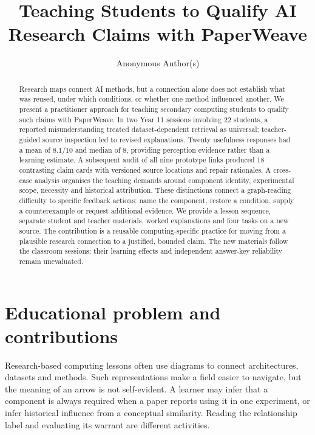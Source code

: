 
\title[Qualifying AI Research Claims with PaperWeave]{Teaching Students to Qualify AI Research Claims with PaperWeave}
\author{Anonymous Author(s)}
\begin{abstract}
Research maps connect AI methods, but a connection alone does not establish what was reused, under which conditions, or whether one method influenced another. We present a practitioner approach for teaching secondary computing students to qualify such claims with PaperWeave. In two Year 11 sessions involving 22 students, a reported misunderstanding treated dataset-dependent retrieval as universal; teacher-guided source inspection led to revised explanations. Twenty usefulness responses had a mean of 8.1/10 and median of 8, providing perception evidence rather than a learning estimate. A subsequent audit of all nine prototype links produced 18 contrasting claim cards with versioned source locations and repair rationales. A cross-case analysis organises the teaching demands around component identity, experimental scope, necessity and historical attribution. These distinctions connect a graph-reading difficulty to specific feedback actions: name the component, restore a condition, supply a counterexample or request additional evidence. We provide a lesson sequence, separate student and teacher materials, worked explanations and four tasks on a new source. The contribution is a reusable computing-specific practice for moving from a plausible research connection to a justified, bounded claim. The new materials follow the classroom sessions; their learning effects and independent answer-key reliability remain unevaluated.
\end{abstract}
\maketitle

\section{Educational problem and contributions}
Research-based computing lessons often use diagrams to connect architectures, datasets and methods. Such representations make a field easier to navigate, but the meaning of an arrow is not self-evident. A learner may infer that a component is always required when a paper reports using it in one experiment, or infer historical influence from a conceptual similarity. Reading the relationship label and evaluating its warrant are different activities.

